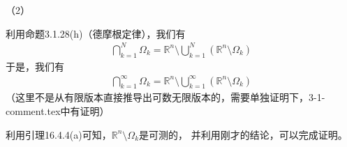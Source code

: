 \documentclass{article}
\begin{document}
（2）

利用命题3.1.28(h)（德摩根定律），我们有
\begin{align*}
  \bigcap\limits_{k = 1}^N \Omega_{k} = \mathbb{R}^n \setminus \bigcup\limits_{k = 1}^N (\mathbb{R}^n \setminus \Omega_{k})
\end{align*}
于是，我们有
\begin{align*}
  \bigcap\limits_{k = 1}^\infty \Omega_{k} = \mathbb{R}^n \setminus \bigcup\limits_{k = 1}^\infty (\mathbb{R}^n \setminus \Omega_{k})
\end{align*}
（这里不是从有限版本直接推导出可数无限版本的，需要单独证明下，3-1-comment.tex中有证明）

利用引理16.4.4(a)可知，$\mathbb{R}^n \setminus \Omega_{k}$是可测的，
并利用刚才的结论，可以完成证明。
\end{document}
